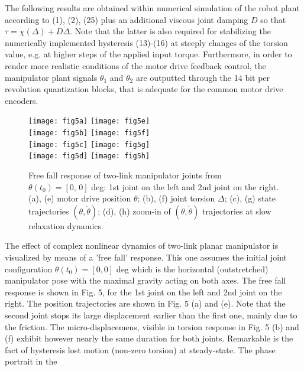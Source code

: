 \documentclass[a4paper, 10pt, conference]{ieeeconf}
\begin{document}
The following results are obtained within numerical simulation of
the robot plant according to (1), (2), (25) plus an additional
viscous joint damping $D$ so that $\tau = \chi(\Delta) + D
\dot{\Delta}$. Note that the latter is also required for
stabilizing the numerically implemented hysteresis (13)-(16) at
steeply changes of the torsion value, e.g. at higher steps of the
applied input torque. Furthermore, in order to render more
realistic conditions of the motor drive feedback control, the
manipulator plant signals $\theta_1$ and $\theta_2$ are outputted
through the 14 bit per revolution quantization blocks, that is
adequate for the common motor drive encoders.

\begin{figure}[!h]
\centering
\texttt{[image: fig5a]}
\texttt{[image: fig5e]}\\
\texttt{[image: fig5b]}
\texttt{[image: fig5f]}\\
\texttt{[image: fig5c]}
\texttt{[image: fig5g]}\\
\texttt{[image: fig5d]}
\texttt{[image: fig5h]}
\caption{Free fall response of two-link manipulator joints from
$\theta(t_{0}) = [0,\, 0]$ deg: 1st joint on the left and 2nd
joint on the right. (a), (e) motor drive position $\theta$; (b),
(f) joint torsion $\Delta$; (c), (g) state trajectories
$(\theta,\dot{\theta})$; (d), (h) zoom-in of
$(\theta,\dot{\theta})$ trajectories at slow relaxation dynamics.}
\label{fig:freefall}
\end{figure}
The effect of complex nonlinear dynamics of two-link planar
manipulator is visualized by means of a 'free fall' response. This
one assumes the initial joint configuration $\theta (t_{0})= [0,
0]$ deg which is the horizontal (outstretched) manipulator pose
with the maximal gravity acting on both axes. The free fall
response is shown in Fig. 5, for the 1st joint on the left and 2nd
joint on the right. The position trajectories are shown in Fig. 5
(a) and (e). Note that the second joint stops its large
displacement earlier than the first one, mainly due to the
friction. The micro-displacemens, visible in torsion response in
Fig. 5 (b) and (f) exhibit however nearly the same duration for
both joints. Remarkable is the fact of hysteresis lost motion
(non-zero torsion) at steady-state. The phase portrait in the
\end{document}
